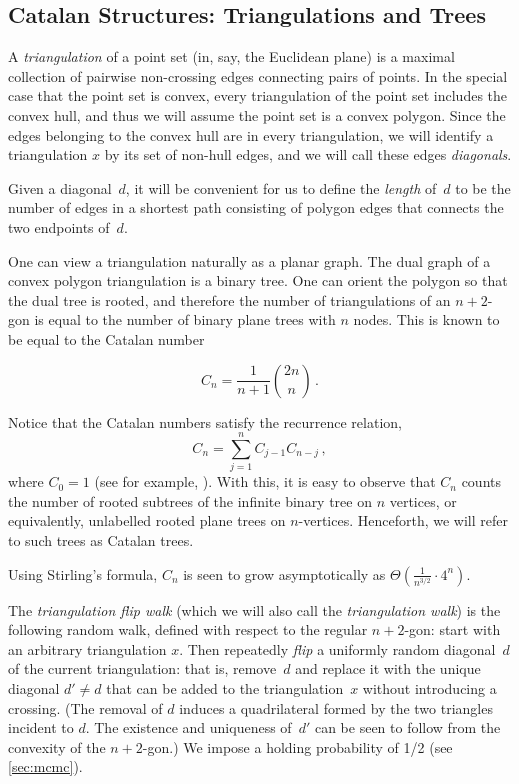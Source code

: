 \documentclass[a4paper, 12p]{article}
\numberwithin{equation}{section}
\begin{document}
\subsection{Catalan Structures: Triangulations and Trees}
A \emph{triangulation} of a point set (in, say, the Euclidean plane) is a maximal collection of pairwise non-crossing edges connecting pairs of points. In the special case that the point set is convex, every triangulation of the point set includes the convex hull, and thus we will assume the point set is a convex polygon. Since the edges belonging to the convex hull are in every triangulation, we will identify a triangulation $x$ by its set of non-hull edges, and we will call these edges \emph{diagonals}.

Given a diagonal~$d$, it will be convenient for us to define the \emph{length} of~$d$ to be the number of edges in a shortest path consisting of polygon edges that connects the two endpoints of~$d$. 

One can view a triangulation naturally as a planar graph. The dual graph of a convex polygon triangulation is a binary tree. One can orient the polygon so that the dual tree is rooted, and therefore the number of triangulations of an $n+2$-gon is equal to the number of binary plane trees with $n$ nodes. This is known to be equal to the Catalan number~\cite{hiltonpedersen}


\[
    C_n = \frac{1}{n+1}\binom{2n}{n}\,.
\] 

Notice that the Catalan numbers satisfy the recurrence relation,
\[ C_n = \sum_{j = 1}^{n} C_{j-1} C_{n-j}\,, \]
where $C_0 = 1$ (see for example, \cite[Chapters 5 and 7]{concretemathematics}). With this, it is easy to observe that $C_n$ counts the number of rooted subtrees of the infinite binary tree on $n$ vertices, or equivalently, unlabelled rooted plane trees on $n$-vertices. Henceforth, we will refer to such trees as Catalan trees.

Using Stirling's formula, $C_n$ is seen to grow asymptotically as $\Theta\left(\frac{1}{n^{3/2}}\cdot 4^n\right)$.

The \emph{triangulation flip walk} (which we will also call the \emph{triangulation walk}) is the following random walk, defined with respect to the regular $n+2$-gon: start with an arbitrary triangulation $x$. Then repeatedly \emph{flip} a uniformly random diagonal~$d$ of the current triangulation: that is, remove~$d$ and replace it with the unique diagonal $d' \neq d$ that can be added to the triangulation~$x$ without introducing a crossing. (The removal of $d$ induces a quadrilateral formed by the two triangles incident to $d$. The existence and uniqueness of~$d'$ can be seen to follow from the convexity of the $n+2$-gon.) We impose a holding probability of 1/2 (see \cref{sec:mcmc}).
\end{document}
